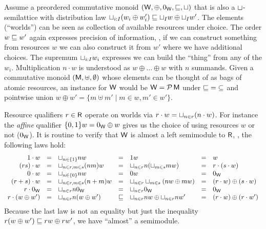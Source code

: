 \documentclass[acmsmall,review,anonymous]{acmart}\settopmatter{printfolios=true,printccs=false,printacmref=false}
\theoremstyle{remark}
\begin{document}
Assume a preordered commutative monoid $(\mathsf{W},\oplus,0_{\mathsf{W}},\sqsubseteq,\sqcup)$
that is also a $\sqcup$-semilattice with distribution law $\sqcup_{i:I} (w_i \oplus w'_i) \sqsubseteq \sqcup_I w \oplus \sqcup_I w'$.  The elements (``worlds'') can be
seen as collection of available resources under choice.  The
order $w \sqsubseteq w'$ again expresses precision of information, \ie, if
we can construct something from resources $w$ we can also construct it
from $w'$ where we have additional choices.
The supremum $\sqcup_{i:I}w_i$ expresses we can build the
``thing'' from any of the $w_i$.  Multiplication $n \cdot w$ is
understood as $w \oplus \dots \oplus w$ with $n$ summands.
%
Given a commutative monoid $(\mathsf{M},\uplus,\emptyset)$ whose elements can
be thought of as bags of atomic resources, an instance for $\mathsf{W}$ would
be $\mathsf{W} = \mathcal{P}\,\mathsf{M}$ under ${\sqsubseteq} = {\subseteq}$ and pointwise union
$w \oplus w' = \{ m \uplus m' \mid m \in w, m' \in w' \}$.

Resource qualifiers $r \in \mathsf{R}$ operate on worlds via
$r \cdot w = \sqcup_{n \in r} (n \cdot w)$.
%
For instance the \emph{affine} qualifier $\{0,1\}w = 0_{\mathsf{W}} \oplus w$
gives us the choice of using resources $w$ or not ($0_{\mathsf{W}}$).
%
It is routine to verify that $\mathsf{W}$ is almost a left semimodule to $\mathsf{R}$,
\ie, the following laws hold:
\[
\begin{array}{rclclcl}
  1 \cdot w
    & = & \sqcup_{n \in \{1\}} nw
    & = & 1w
    & = & w
\\
  (rs) \cdot w
    & = & \sqcup_{n \in r, m \in s} (nm)w
    & = & \sqcup_{n \in r} n(\sqcup_{m \in s} mw)
    & = & r \cdot (s \cdot w)
\\
  0 \cdot w
    & = & \sqcup_{n \in \{0\}} nw
    & = & 0w
    & = & 0_{\mathsf{W}}
\\
  (r + s) \cdot w
    & = & \sqcup_{n \in r, m \in s} (n+m)w
    & = & \sqcup_{n \in r} \sqcup_{m \in s} (nw \oplus mw)
    & = & (r \cdot w) \oplus (s \cdot w)
\\
  r \cdot 0_{\mathsf{W}}
    & = & \sqcup_{n \in r} n0_{\mathsf{W}}
    & = & \sqcup_{n \in r} 0_{\mathsf{W}}
    & = & 0_{\mathsf{W}}
\\
  r \cdot (w \oplus w')
    & = & \sqcup_{n \in r} n(w \oplus w')
    & \sqsubseteq & \sqcup_{n \in r} nw \oplus \sqcup_{n \in r} nw'
    & = & (r \cdot w) \oplus (r \cdot w')
\\
\end{array}
\]
Because the last law is not an equality but just the inequality
$r (w \oplus w') \sqsubseteq rw \oplus rw'$, we have ``almost'' a
semimodule.
\end{document}
